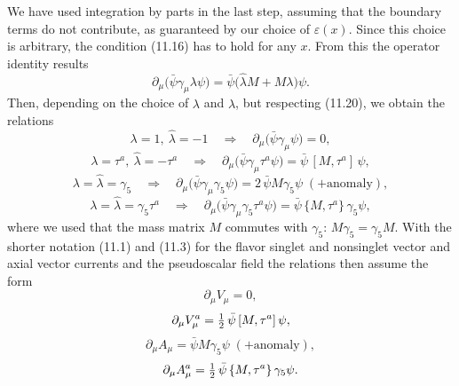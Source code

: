 We have used integration by parts in the last step, assuming that the boundary
terms do not contribute, as guaranteed by our choice of $\varepsilon(x)$. Since this choice
is arbitrary, the condition (11.16) has to hold for any $x$. From this the operator
identity results
\begin{equation}
\partial_\mu\bigl(\bar{\psi}\gamma_\mu\lambda\psi\bigr) = \bar{\psi}\bigl(\hat{\lambda}M + M\lambda\bigr)\psi .
\end{equation}
Then, depending on the choice of $\lambda$ and $\hat{\lambda}$, but respecting (11.20), we obtain
the relations
\begin{equation}
\lambda = 1,\ \hat{\lambda} = -1 \quad\Rightarrow\quad
\partial_\mu\bigl(\bar{\psi}\gamma_\mu\psi\bigr) = 0 ,
\end{equation}
\begin{equation}
\lambda = \tau^a,\ \hat{\lambda} = -\tau^a \quad\Rightarrow\quad
\partial_\mu\bigl(\bar{\psi}\gamma_\mu\tau^a\psi\bigr) = \bar{\psi}\,[M,\tau^a]\,\psi ,
\end{equation}
\begin{equation}
\lambda = \hat{\lambda} = \gamma_5 \quad\Rightarrow\quad
\partial_\mu\bigl(\bar{\psi}\gamma_\mu\gamma_5\psi\bigr) = 2\,\bar{\psi}M\gamma_5\psi
\;(+\mathrm{anomaly}) ,
\end{equation}
\begin{equation}
\lambda = \hat{\lambda} = \gamma_5\tau^a \quad\Rightarrow\quad
\partial_\mu\bigl(\bar{\psi}\gamma_\mu\gamma_5\tau^a\psi\bigr)
= \bar{\psi}\,\{M,\tau^a\}\,\gamma_5\psi ,
\end{equation}
where we used that the mass matrix $M$ commutes with $\gamma_5$: $M\gamma_5 = \gamma_5 M$.
With the shorter notation (11.1) and (11.3) for the flavor singlet and nonsinglet vector and axial vector currents and the pseudoscalar field the relations
then assume the form
\begin{equation}
\partial_\mu V_\mu = 0 ,
\end{equation}
\begin{equation}
\partial_\mu V_\mu^a = \tfrac{1}{2}\,\bar{\psi}\,[M,\tau^a]\,\psi ,
\end{equation}
\begin{equation}
\partial_\mu A_\mu = \bar{\psi}M\gamma_5\psi \;(+\mathrm{anomaly}) ,
\end{equation}
\begin{equation}
\partial_\mu A_\mu^a = \tfrac{1}{2}\,\bar{\psi}\,\{M,\tau^a\}\,\gamma_5\psi .
\end{equation}

